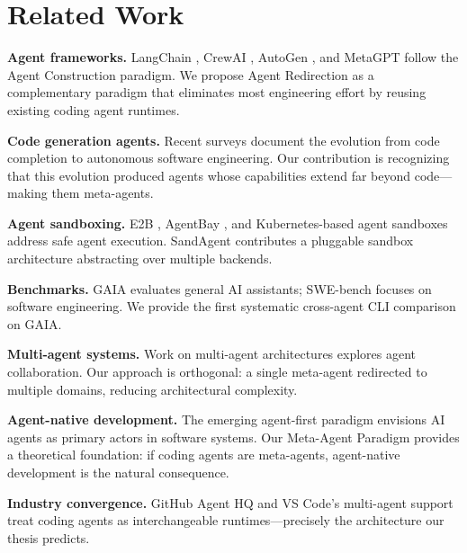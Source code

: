 \section{Related Work}

\textbf{Agent frameworks.} LangChain \citep{langchain2023}, CrewAI \citep{crewai2024}, AutoGen \citep{wu2023autogen}, and MetaGPT \citep{hong2023metagpt} follow the Agent Construction paradigm. We propose Agent Redirection as a complementary paradigm that eliminates most engineering effort by reusing existing coding agent runtimes.

\textbf{Code generation agents.} Recent surveys \citep{codeagentsurvey2025, agenticprogramming2025} document the evolution from code completion to autonomous software engineering. Our contribution is recognizing that this evolution produced agents whose capabilities extend far beyond code---making them meta-agents.

\textbf{Agent sandboxing.} E2B \citep{e2b2024}, AgentBay \citep{agentbay2025}, and Kubernetes-based agent sandboxes \citep{agentsandbox2025} address safe agent execution. SandAgent contributes a pluggable sandbox architecture abstracting over multiple backends.

\textbf{Benchmarks.} GAIA \citep{mialon2023gaia} evaluates general AI assistants; SWE-bench \citep{jimenez2024swebench} focuses on software engineering. We provide the first systematic cross-agent CLI comparison on GAIA.

\textbf{Multi-agent systems.} Work on multi-agent architectures \citep{multiagentcomm2025} explores agent collaboration. Our approach is orthogonal: a single meta-agent redirected to multiple domains, reducing architectural complexity.

\textbf{Agent-native development.} The emerging agent-first paradigm \citep{agentnative2026} envisions AI agents as primary actors in software systems. Our Meta-Agent Paradigm provides a theoretical foundation: if coding agents are meta-agents, agent-native development is the natural consequence.

\textbf{Industry convergence.} GitHub Agent HQ \citep{github2026agenthq} and VS Code's multi-agent support \citep{vscode2026multiagent} treat coding agents as interchangeable runtimes---precisely the architecture our thesis predicts.
